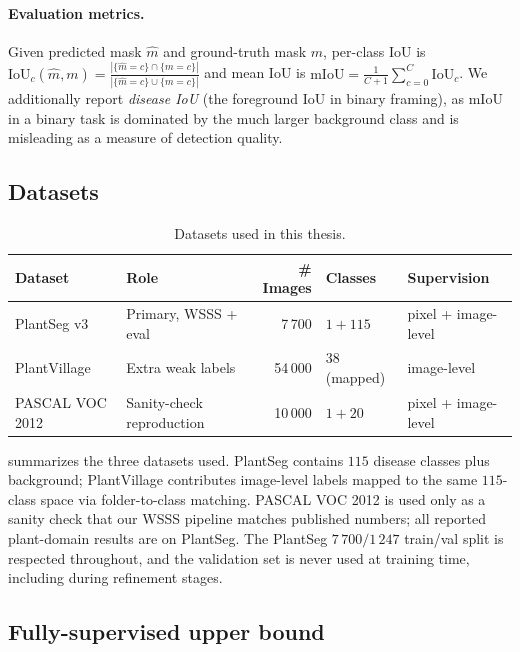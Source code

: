 \documentclass[11pt,a4paper]{article}
\newcommand{\IoU}{\mathrm{IoU}}
\newcommand{\mIoU}{\mathrm{mIoU}}
\begin{document}
\paragraph{Evaluation metrics.}
Given predicted mask $\hat m$ and ground-truth mask $m$, per-class IoU is
$\IoU_c(\hat m,m)=\frac{|\{\hat m=c\}\cap\{m=c\}|}{|\{\hat m=c\}\cup\{m=c\}|}$
and mean IoU is $\mIoU=\frac{1}{C+1}\sum_{c=0}^{C}\IoU_c$. We additionally
report \emph{disease IoU} (the foreground IoU in binary framing), as
$\mIoU$ in a binary task is dominated by the much larger background
class and is misleading as a measure of detection quality.

\subsection{Datasets}

\begin{table}[t]
\centering
\small
\caption{Datasets used in this thesis.}
\label{tab:datasets}
\begin{tabular}{@{}llrll@{}}
\toprule
Dataset & Role & \# Images & Classes & Supervision \\
\midrule
PlantSeg v3 \citep{plantseg}   & Primary, WSSS + eval     & 7\,700   & $1\!+\!115$ & pixel + image-level \\
PlantVillage \citep{plantvillage} & Extra weak labels        & 54\,000  & 38 (mapped) & image-level \\
PASCAL VOC 2012                 & Sanity-check reproduction & 10\,000  & $1\!+\!20$  & pixel + image-level \\
\bottomrule
\end{tabular}
\end{table}

 summarizes the three datasets used. PlantSeg contains
$115$ disease classes plus background; PlantVillage contributes
image-level labels mapped to the same $115$-class space via
folder-to-class matching. PASCAL VOC 2012 is used only as a sanity check
that our WSSS pipeline matches published numbers; all reported
plant-domain results are on PlantSeg. The PlantSeg $7\,700/1\,247$
train/val split is respected throughout, and the validation set is never
used at training time, including during refinement stages.

\subsection{Fully-supervised upper bound}
\end{document}
